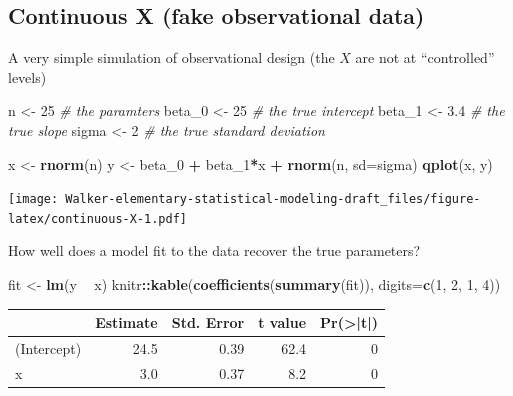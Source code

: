 \documentclass[]{book}
\newenvironment{Shaded}{\begin{snugshade}}{\end{snugshade}}
\newcommand{\KeywordTok}[1]{\textcolor[rgb]{0.13,0.29,0.53}{\textbf{#1}}}
\newcommand{\DataTypeTok}[1]{\textcolor[rgb]{0.13,0.29,0.53}{#1}}
\newcommand{\DecValTok}[1]{\textcolor[rgb]{0.00,0.00,0.81}{#1}}
\newcommand{\FloatTok}[1]{\textcolor[rgb]{0.00,0.00,0.81}{#1}}
\newcommand{\StringTok}[1]{\textcolor[rgb]{0.31,0.60,0.02}{#1}}
\newcommand{\CommentTok}[1]{\textcolor[rgb]{0.56,0.35,0.01}{\textit{#1}}}
\newcommand{\OperatorTok}[1]{\textcolor[rgb]{0.81,0.36,0.00}{\textbf{#1}}}
\newcommand{\NormalTok}[1]{#1}
\begin{document}
\subsection{Continuous X (fake observational
data)}\label{continuous-x-fake-observational-data}

A very simple simulation of observational design (the \(X\) are not at
``controlled'' levels)

\begin{Shaded}
\begin{Highlighting}[]
\NormalTok{n <-}\StringTok{ }\DecValTok{25}
\CommentTok{# the paramters}
\NormalTok{beta_}\DecValTok{0}\NormalTok{ <-}\StringTok{ }\DecValTok{25} \CommentTok{# the true intercept}
\NormalTok{beta_}\DecValTok{1}\NormalTok{ <-}\StringTok{ }\FloatTok{3.4} \CommentTok{# the true slope}
\NormalTok{sigma <-}\StringTok{ }\DecValTok{2} \CommentTok{# the true standard deviation}

\NormalTok{x <-}\StringTok{ }\KeywordTok{rnorm}\NormalTok{(n)}
\NormalTok{y <-}\StringTok{ }\NormalTok{beta_}\DecValTok{0} \OperatorTok{+}\StringTok{ }\NormalTok{beta_}\DecValTok{1}\OperatorTok{*}\NormalTok{x }\OperatorTok{+}\StringTok{ }\KeywordTok{rnorm}\NormalTok{(n, }\DataTypeTok{sd=}\NormalTok{sigma)}
\KeywordTok{qplot}\NormalTok{(x, y)}
\end{Highlighting}
\end{Shaded}

\texttt{[image: Walker-elementary-statistical-modeling-draft\_files/figure-latex/continuous-X-1.pdf]}

How well does a model fit to the data recover the true parameters?

\begin{Shaded}
\begin{Highlighting}[]
\NormalTok{fit <-}\StringTok{ }\KeywordTok{lm}\NormalTok{(y }\OperatorTok{~}\StringTok{ }\NormalTok{x)}
\NormalTok{knitr}\OperatorTok{::}\KeywordTok{kable}\NormalTok{(}\KeywordTok{coefficients}\NormalTok{(}\KeywordTok{summary}\NormalTok{(fit)), }\DataTypeTok{digits=}\KeywordTok{c}\NormalTok{(}\DecValTok{1}\NormalTok{, }\DecValTok{2}\NormalTok{, }\DecValTok{1}\NormalTok{, }\DecValTok{4}\NormalTok{))}
\end{Highlighting}
\end{Shaded}

\begin{tabular}{l|r|r|r|r}
\hline
  & Estimate & Std. Error & t value & Pr(>|t|)\\
\hline
(Intercept) & 24.5 & 0.39 & 62.4 & 0\\
\hline
x & 3.0 & 0.37 & 8.2 & 0\\
\hline
\end{tabular}
\end{document}
